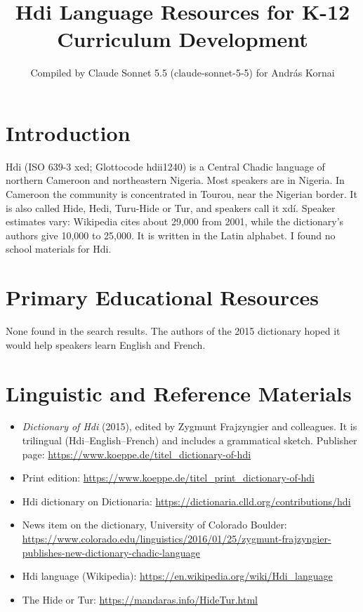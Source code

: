 \documentclass[12pt]{article}
\title{Hdi Language Resources for K-12 Curriculum Development}
\author{Compiled by Claude Sonnet 5.5 (claude-sonnet-5-5) for Andr\'as Kornai}
\date{}
\begin{document}
\maketitle

\section{Introduction}
Hdi (ISO 639-3 xed; Glottocode hdii1240) is a Central Chadic language of northern Cameroon and northeastern Nigeria. Most speakers are in Nigeria. In Cameroon the community is concentrated in Tourou, near the Nigerian border. It is also called Hide, Hedi, Turu-Hide or Tur, and speakers call it xd\'i. Speaker estimates vary: Wikipedia cites about 29,000 from 2001, while the dictionary's authors give 10,000 to 25,000. It is written in the Latin alphabet. I found no school materials for Hdi.

\section{Primary Educational Resources}
None found in the search results. The authors of the 2015 dictionary hoped it would help speakers learn English and French.

\section{Linguistic and Reference Materials}
\begin{itemize}
\item \emph{Dictionary of Hdi} (2015), edited by Zygmunt Frajzyngier and colleagues. It is trilingual (Hdi--English--French) and includes a grammatical sketch. Publisher page: \url{https://www.koeppe.de/titel_dictionary-of-hdi}
\item Print edition: \url{https://www.koeppe.de/titel_print_dictionary-of-hdi}
\item Hdi dictionary on Dictionaria: \url{https://dictionaria.clld.org/contributions/hdi}
\item News item on the dictionary, University of Colorado Boulder: \url{https://www.colorado.edu/linguistics/2016/01/25/zygmunt-frajzyngier-publishes-new-dictionary-chadic-language}
\item Hdi language (Wikipedia): \url{https://en.wikipedia.org/wiki/Hdi_language}
\item The Hide or Tur: \url{https://mandaras.info/HideTur.html}
\end{itemize}
\end{document}
